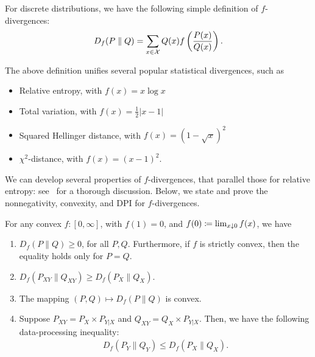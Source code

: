         \begin{remark}
            \label{remark:discrete-f-div} For discrete distributions, we have the following simple definition of $f$-divergences: 
            \begin{align}
                D_f(P \parallel Q) = \sum_{x \in \mathcal{X}} Q(x) f\left( \frac{P(x)}{Q(x)} \right). \label{eq:discrete-f-div}
            \end{align}
        \end{remark}

        \begin{remark}
            \label{remark:instances-of-f-div} 
            The above definition unifies several popular statistical divergences, such as 
            \begin{itemize}
                \item Relative entropy, with $f(x) = x \log x$ 
                \item Total variation, with $f(x) = \frac{1}{2}|x-1|$ 
                \item Squared Hellinger distance, with $f(x) = (1-\sqrt{x})^2$
                \item $\chi^2$-distance, with $f(x) = (x-1)^2$. 
            \end{itemize}
        \end{remark}
        We can develop several properties of $f$-divergences, that parallel those for relative entropy: see~\citet[Chapter 7]{polyanskiy2023ITbook} for a thorough discussion. Below, we state and prove the nonnegativity, convexity, and DPI for $f$-divergences. 
        \begin{proposition}
            \label{prop:f-div-properties} For any convex $f:[0, \infty]$, with $f(1) = 0$, and $f(0) \coloneqq \lim_{x \downarrow 0} f(x)$, we have 
            \begin{enumerate}[label=(\alph*)]
                \item $D_f(P\parallel Q) \geq 0$, for all $P, Q$. Furthermore, if $f$ is strictly convex, then the equality holds only for $P=Q$. 
                \item $D_f(P_{XY} \parallel Q_{XY} ) \geq D_f(P_X \parallel Q_X)$. 
                \item The mapping $(P, Q) \mapsto D_f(P \parallel Q)$ is convex.  
                \item Suppose $P_{XY} = P_X \times P_{Y|X}$ and $Q_{XY} = Q_X \times P_{Y|X}$. Then, we have the following data-processing inequality:
                \begin{align}
                    D_f(P_Y \parallel Q_Y) \leq D_f(P_X \parallel Q_X). 
                \end{align}
           \end{enumerate}
        \end{proposition}
